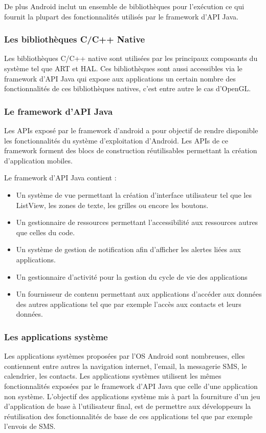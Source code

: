 \documentclass[11]{article}
\begin{document}
 \vspace{0.5cm}
 
De plus Android inclut un ensemble de bibliothèques pour l'exécution ce qui fournit la plupart des fonctionnalités utilisés par le framework d’API Java.

\subsubsection{Les bibliothèques C/C++ Native}
Les bibliothèques C/C++ native sont utilisées par les principaux composants du système tel que ART et HAL. Ces bibliothèques sont aussi accessibles via le framework d’API Java qui expose aux applications un certain nombre des fonctionnalités de ces bibliothèques natives, c’est entre autre le cas d’OpenGL.

\subsubsection{Le framework d’API Java}
Les APIs exposé par le framework d’android a pour objectif de rendre disponible les fonctionnalités du système d’exploitation d’Android.
Les APIs de ce framework forment des blocs de construction réutilisables permettant la création d'application mobiles.

 \vspace{0.5cm}
 
Le framework d’API Java contient :
\begin{itemize}
\item Un système de vue permettant la création d’interface utilisateur tel que les ListView, les zones de texte, les grilles ou encore les boutons.
\item Un gestionnaire de ressources permettant l’accessibilité aux ressources autres que celles du code.
\item Un système de gestion de notification afin d’afficher les alertes liées aux applications.
\item Un gestionnaire d’activité pour la gestion du cycle de vie des applications
\item Un fournisseur de contenu permettant aux applications d’accéder aux données des autres applications tel que par exemple l’accès aux contacts et leurs données.
\end{itemize}

\subsubsection{Les applications système}
Les applications systèmes proposées par l’OS Android sont nombreuses, elles contiennent entre autres la navigation internet, l’email, la messagerie SMS, le calendrier, les contacts.
Les applications systèmes utilisent les mêmes fonctionnalités exposées par le framework d’API Java que celle d’une application non système.
L'objectif des applications système mis à part la fourniture d’un jeu d’application de base à l’utilisateur final, est de permettre aux développeurs la réutilisation des fonctionnalités de base de ces applications tel que par exemple l’envois de SMS.
\end{document}
